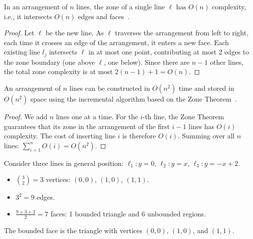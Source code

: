 \begin{theorem}
\label{thm:zone_theorem}
In an arrangement of $n$ lines, the zone of a single line $\ell$ has $O(n)$ complexity, i.e., it intersects $O(n)$ edges and faces~\cite{edelsbrunner1986}.
\end{theorem}
\begin{proof}
Let $\ell$ be the new line. As $\ell$ traverses the arrangement from left to right, each time it crosses an edge of the arrangement, it enters a new face. Each existing line $l_j$ intersects $\ell$ in at most one point, contributing at most 2 edges to the zone boundary (one above $\ell$, one below). Since there are $n-1$ other lines, the total zone complexity is at most $2(n-1) + 1 = O(n)$.
\end{proof}

\begin{theorem}
\label{thm:la_complexity}
An arrangement of $n$ lines can be constructed in $O(n^2)$ time and stored in $O(n^2)$ space using the incremental algorithm based on the Zone Theorem~\cite{edelsbrunner1986}.
\end{theorem}
\begin{proof}
We add $n$ lines one at a time. For the $i$-th line, the Zone Theorem guarantees that its zone in the arrangement of the first $i-1$ lines has $O(i)$ complexity. The cost of inserting line $i$ is therefore $O(i)$. Summing over all $n$ lines: $\sum_{i=1}^{n} O(i) = O(n^2)$.
\end{proof}

\begin{example}
\label{ex:la_3lines}
Consider three lines in general position: $\ell_1: y = 0$, $\ell_2: y = x$, $\ell_3: y = -x + 2$.
\begin{itemize}
    \item $\binom{3}{2} = 3$ vertices: $(0,0)$, $(1,0)$, $(1,1)$.
    \item $3^2 = 9$ edges.
    \item $\frac{9+3+2}{2} = 7$ faces: 1 bounded triangle and 6 unbounded regions.
\end{itemize}
The bounded face is the triangle with vertices $(0,0)$, $(1,0)$, and $(1,1)$.
\end{example}

